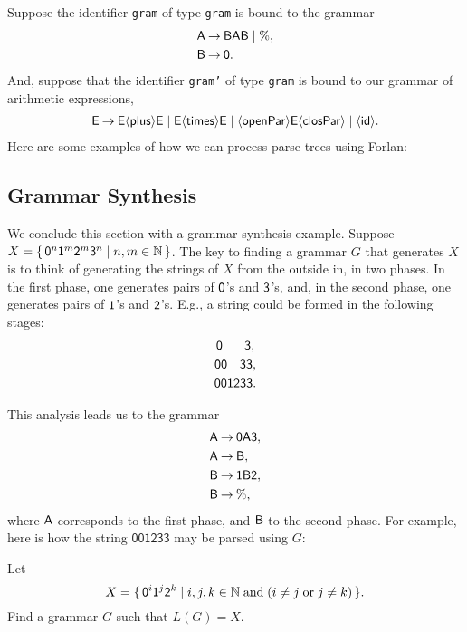 Suppose the identifier \texttt{gram} of type \texttt{gram} is bound to the
grammar
\begin{align*}
\mathsf{A} &\mathbin{\to} \mathsf{B}\mathsf{A}\mathsf{B} \mid \% , \\
\mathsf{B} &\mathbin{\to} \mathsf{0} .
\end{align*}
And, suppose that the identifier
\texttt{gram'} of type \texttt{gram} is bound to our grammar of
arithmetic expressions,
\begin{gather*}
\mathsf{E\mathbin{\to} E{\langle\mathsf{plus}\rangle} E\mid E{\langle\mathsf{times}\rangle} E\mid {\langle\mathsf{openPar}\rangle} E{\langle\mathsf{closPar}\rangle} \mid
{\langle\mathsf{id}\rangle}} .
\end{gather*}
Here are some examples of how we can process parse trees using Forlan:


\subsection{Grammar Synthesis}

We conclude this section with a grammar synthesis example.  Suppose
$X=\{ \, \mathsf{0}^n\mathsf{1}^m\mathsf{2}^m\mathsf{3}^n \mid n,m\in\mathbb{N} \, \}$.  The key
to finding a grammar $G$ that generates $X$ is to think of generating
the strings of $X$ from the outside in, in two phases.  In the first
phase, one generates pairs of $\mathsf{0}$'s and $\mathsf{3}$'s, and, in
the second phase, one generates pairs of $\mathsf{1}$'s and $\mathsf{2}$'s.
E.g., a string could be formed in the following stages:
\begin{gather*}
{\mathsf{0\hspace{.6cm}3,}} \\
{\mathsf{00\hspace{.34cm}33,}} \\
{\mathsf{001233.}}
\end{gather*}

This analysis leads us to the grammar
\begin{align*}
\mathsf{A} &\mathbin{\to} \mathsf{0}\mathsf{A}\mathsf{3} , \\
\mathsf{A} &\mathbin{\to} \mathsf{B} , \\
\mathsf{B} &\mathbin{\to} \mathsf{1}\mathsf{B}\mathsf{2} , \\
\mathsf{B} &\mathbin{\to} \% ,
\end{align*}
where $\mathsf{A}$ corresponds to the first phase, and $\mathsf{B}$ to the
second phase.
For example, here is how the string $\mathsf{001233}$ may be
parsed using $G$:
\begin{center}

\end{center}

\begin{exercise}
Let
\begin{displaymath}
X = \{ \, \mathsf{0}^i\mathsf{1}^j\mathsf{2}^k \mid i,j,k\in\mathbb{N}\;\allowbreak\mbox{and}\allowbreak\;
(i\neq j\;\allowbreak\mbox{or}\allowbreak\;j\neq k) \, \} .
\end{displaymath}
Find a grammar $G$ such that $L(G)=X$.
\end{exercise}

